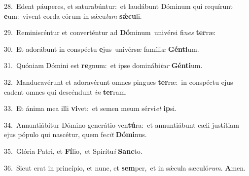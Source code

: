 {\numbfont\textcolor{\numbcolor}{28.}}~Edent páuperes, et saturabúntur:~\dagger et laudábunt Dóminum qui requírunt \textbf{e}\-um:~\star vivent corda eórum in sǽcu\textit{lum} \textbf{sǽ}\-\textbf{cu}li.\par
{\numbfont\textcolor{\numbcolor}{29.}}~Reminiscéntur et converténtur ad \textbf{Dó}\-minum~\star univérsi fi\textit{nes} \textbf{ter}\-ræ:\par
{\numbfont\textcolor{\numbcolor}{30.}}~Et adorábunt in conspéctu \textbf{e}\-jus~\star univérsæ famíli\textit{æ} \textbf{Gén}\-\textbf{ti}um.\par
{\numbfont\textcolor{\numbcolor}{31.}}~Quóniam Dómini est \textbf{re}\-gnum:~\star et ipse dominábi\textit{tur} \textbf{Gén}\-\textbf{ti}um.\par
{\numbfont\textcolor{\numbcolor}{32.}}~Manducavérunt et adoravérunt omnes pingues \textbf{ter}\-ræ:~\star in conspéctu ejus cadent omnes qui descéndunt \textit{in} \textbf{ter}\-ram.\par
{\numbfont\textcolor{\numbcolor}{33.}}~Et ánima mea illi \textbf{vi}\-vet:~\star et semen meum sérvi\textit{et} \textbf{ip}\-si.\par
{\numbfont\textcolor{\numbcolor}{34.}}~Annuntiábitur Dómino generátio ven\-\textbf{tú}\-ra:~\star et annuntiábunt cæli justítiam ejus pópulo qui nascétur, quem fe\textit{cit} \textbf{Dó}\-\textbf{mi}nus.\par
{\numbfont\textcolor{\numbcolor}{35.}}~Glória Patri, et \textbf{Fí}\-lio,~\star et Spirítu\textit{i} \textbf{Sanc}\-to.\par
{\numbfont\textcolor{\numbcolor}{36.}}~Sicut erat in princípio, et nunc, et \textbf{sem}\-per,~\star et in sǽcula sæculó\-\textit{rum}\-. \textbf{A}\-men.\par
